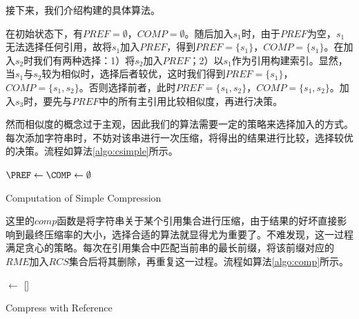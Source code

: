 ﻿\documentclass{sysuthesis}
\begin{document}
接下来，我们介绍构建的具体算法。\par
在初始状态下，有$PREF = \emptyset$，$COMP = \emptyset$。随后加入$s_{1}$时，由于$PREF$为空，$s_{1}$无法选择任何引用，故将$s_{1}$加入$PREF$，得到$PREF = \{s_{1}\}$，$COMP = \{s_{1}\}$。在加入$s_{2}$时我们有两种选择：1）将$s_{2}$加入$PREF$；2）以$s_{1}$作为引用构建索引。显然，当$s_{1}$与$s_{2}$较为相似时，选择后者较优，这时我们得到$PREF = \{s_{1}\}$，$COMP = \{s_{1}, s_{2}\}$。否则选择前者，此时$PREF = \{s_{1}, s_{2}\}$，$COMP = \{s_{1}, s_{2}\}$。加入$s_{3}$时，要先与$PREF$中的所有主引用比较相似度，再进行决策。\par
然而相似度的概念过于主观，因此我们的算法需要一定的策略来选择加入的方式。每次添加字符串时，不妨对该串进行一次压缩，将得出的结果进行比较，选择较优的决策。流程如算法\ref{algo:csimple}所示。\par

\begin{algorithm}[H]
	\Output{\PREF, \COMP}
	$\PREF \leftarrow \COMP \leftarrow \emptyset$\;
	\caption{Computation of Simple Compression}\label{algo:csimple}
\end{algorithm}

这里的$comp$函数是将字符串关于某个引用集合进行压缩，由于结果的好坏直接影响到最终压缩率的大小，选择合适的算法就显得尤为重要了。不难发现，这一过程满足贪心的策略。每次在引用集合中匹配当前串的最长前缀，将该前缀对应的$RME$加入$RCS$集合后将其删除，再重复这一过程。流程如算法\ref{algo:comp}所示。\par

\begin{algorithm}[H]
	\rcs $\leftarrow$ []\;
	\caption{Compress with Reference}\label{algo:comp}
\end{algorithm}
\end{document}
